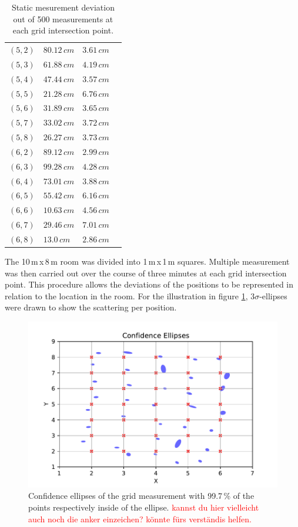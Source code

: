 \documentclass[conference, a4paper]{IEEEtran}
\begin{document}
\begin{table}[hbt!]
\begin{tabular}{l l l c}
		$(5,2)$ & $80.12\,cm$ & $3.61\,cm$\\
		$(5,3)$ & $61.88\,cm$ & $4.19\,cm$\\
		$(5,4)$ & $47.44\,cm$ & $3.57\,cm$\\
		$(5,5)$ & $21.28\,cm$ & $6.76\,cm$\\
		$(5,6)$ & $31.89\,cm$ & $3.65\,cm$\\
		$(5,7)$ & $33.02\,cm$ & $3.72\,cm$\\
		$(5,8)$ & $26.27\,cm$ & $3.73\,cm$\\
		
		$(6,2)$ & $89.12\,cm$ & $2.99\,cm$\\
		$(6,3)$ & $99.28\,cm$ & $4.28\,cm$\\
		$(6,4)$ & $73.01\,cm$ & $3.88\,cm$\\
		$(6,5)$ & $55.42\,cm$ & $6.16\,cm$\\
		$(6,6)$ & $10.63\,cm$ & $4.56\,cm$\\
		$(6,7)$ & $29.46\,cm$ & $7.01\,cm$\\
		$(6,8)$ & $13.0\,cm$ & $2.86\,cm$\\
		
	\end{tabular}
	\caption{Static mesurement deviation out of 500 measurements at each grid intersection point.}
	\label{table:measurements}
\end{table}

The 10\,m\,x\,8\,m room was divided into 1\,m\,x\,1\,m squares. 
Multiple measurement was then carried out over the course of three minutes at each grid intersection point.
This procedure allows the deviations of the positions to be represented in relation to the location in the room.
For the illustration in figure \ref{fig:statistics}, $3\sigma$-ellipses were drawn to show the scattering per position.

\begin{figure}[hbt!]
	\includegraphics[scale=0.63]{pic/position_plot.pdf}
	\caption{Confidence ellipses of the grid measurement with 99.7\,\% of the points respectively inside of the ellipse.
	\textcolor{red}{kannst du hier vielleicht auch noch die anker einzeichen? könnte fürs verständis helfen.}}
	\label{fig:statistics}
\end{figure}
\end{document}
